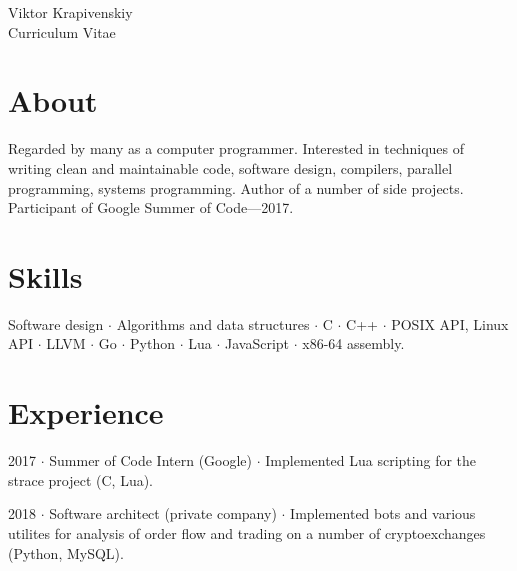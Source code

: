 \documentclass[10pt]{article}
\begin{document}
\parbox[top][0.12\textheight][c]{\linewidth}{
    \vspace{-0.04\textheight}
    \centering
    {\sffamily\Huge Viktor Krapivenskiy}\\\medskip
    {\Huge Curriculum Vitae}
}

\medskip

\section{About}

Regarded by many as a computer programmer.
Interested in
  techniques of writing clean and maintainable code,
  software design,
  compilers,
  parallel programming,
  systems programming.
Author of a number of side projects.
Participant of Google Summer of Code---2017.

\medskip

\section{Skills}

Software design $\cdot$
Algorithms and data structures $\cdot$
C $\cdot$
C++ $\cdot$
POSIX API, Linux API $\cdot$
LLVM $\cdot$
Go $\cdot$
Python $\cdot$
Lua $\cdot$
JavaScript $\cdot$
x86-64 assembly.

\medskip

%
%

\section{Experience}

2017 $\cdot$ Summer of Code Intern (Google) $\cdot$ Implemented Lua scripting for the strace project (C, Lua).

\medskip

2018 $\cdot$ Software architect (private company) $\cdot$ Implemented bots and various utilites for analysis of order flow and trading on a number of cryptoexchanges (Python, MySQL).
\end{document}
